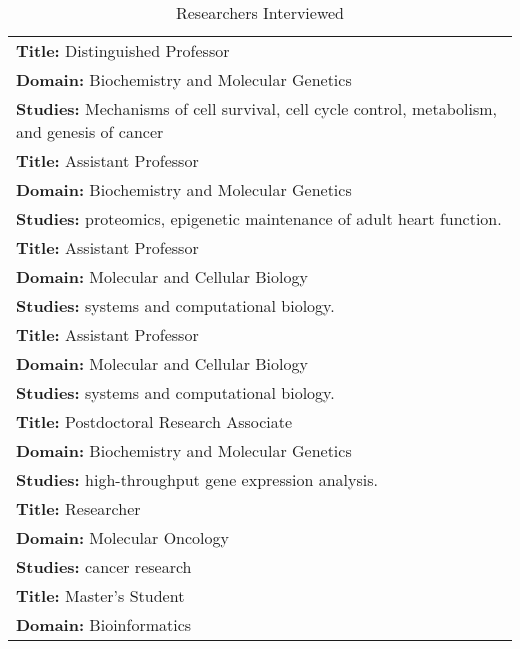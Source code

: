 \documentclass[twocolumn]{bmcart}%
\begin{document}
\newcommand\T{\rule{0pt}{2.6ex}}
\newcommand\B{\rule[-1.2ex]{0pt}{0pt}}
\begin{table}[!ht]
 \caption{Researchers Interviewed}
 \begin{center}
   \begin{tabular}{|p{6.5cm}|}
     \hline \textbf{Title:} Distinguished Professor \T \\
     \textbf{Domain:} Biochemistry and Molecular Genetics \\
     \textbf{Studies:} Mechanisms of cell survival, cell cycle control, metabolism, and genesis of cancer \B
     \\ %
     \hline \textbf{Title:} Assistant Professor \T \\
     \textbf{Domain:} Biochemistry and Molecular Genetics \\
     \textbf{Studies:} proteomics, epigenetic maintenance of adult heart function. \B
     \\ %
     \hline \textbf{Title:} Assistant Professor \T \\
     \textbf{Domain:} Molecular and Cellular Biology \\
     \textbf{Studies:} systems and computational biology. \B
     \\ %
     \hline \textbf{Title:} Assistant Professor \T \\
     \textbf{Domain:} Molecular and Cellular Biology \\
     \textbf{Studies:} systems and computational biology. \B
     \\ %
     \hline \textbf{Title:} Postdoctoral Research Associate \T \\
     \textbf{Domain:} Biochemistry and Molecular Genetics \\
     \textbf{Studies:} high-throughput gene expression analysis. \B
     \\ %
     \hline \textbf{Title:} Researcher \T \\
     \textbf{Domain:} Molecular Oncology \\
     \textbf{Studies:} cancer research \B
     \\ %
     \hline \textbf{Title:} Master's Student \T \\
     \textbf{Domain:} Bioinformatics
     \\
     \hline
   \end{tabular}
   \label{table:interviews}
 \end{center}
\end{table}
\end{document}
